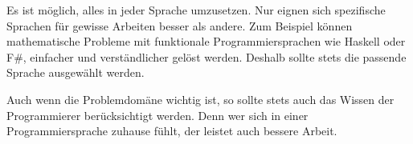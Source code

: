 Es ist möglich, alles in jeder Sprache umzusetzen. Nur eignen sich spezifische Sprachen für gewisse Arbeiten besser als andere. Zum Beispiel können mathematische Probleme mit funktionale Programmiersprachen wie Haskell oder F\#, einfacher und verständlicher gelöst werden. Deshalb sollte stets die passende Sprache ausgewählt werden.

Auch wenn die Problemdomäne wichtig ist, so sollte stets auch das Wissen der Programmierer berücksichtigt werden. Denn wer sich in einer Programmiersprache zuhause fühlt, der leistet auch bessere Arbeit.

\glsaddall
